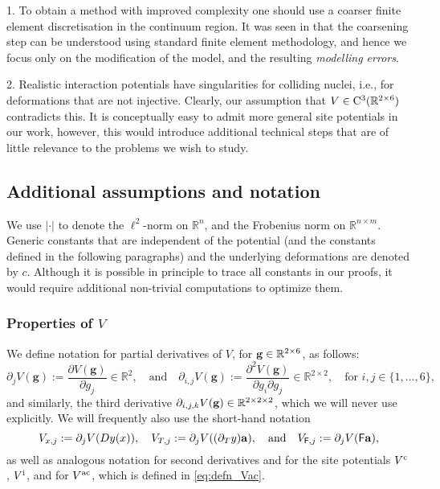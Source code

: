 \documentclass[12pt, reqno, a4paper]{amsart}
\numberwithin{equation}{section}
\numberwithin{theorem}{section}
\numberwithin{remark}{section}
\begin{document}
\begin{remark}
  1. To obtain a method with improved complexity one should use a
  coarser finite element discretisation in the continuum region. It
  was seen in \cite{OrtnerWang:2009a, Ortner:2011:patch} that the
  coarsening step can be understood using standard finite element
  methodology, and hence we focus only on the modification of the
  model, and the resulting {\em modelling errors}.

  2.  Realistic interaction potentials have singularities for
  colliding nuclei, i.e., for deformations that are not
  injective. Clearly, our assumption that $V \in {{\rm C}}^3({\mathbb{R}}^{2 \times
    6})$ contradicts this. It is conceptually easy to admit more
  general site potentials in our work, however, this would introduce
  additional technical steps that are of little relevance to the
  problems we wish to study.
\end{remark}

\subsection{Additional assumptions and notation}
We use $|\cdot|$ to denote the $\ell^2$-norm on ${\mathbb{R}}^n$, and the
Frobenius norm on ${\mathbb{R}}^{n \times m}$. Generic constants that are
independent of the potential (and the constants defined in the
following paragraphs) and the underlying deformations are denoted by
$c$. Although it is possible in principle to trace all constants in
our proofs, it would require additional non-trivial computations to
optimize them.

\subsubsection{Properties of $V$}
\label{sec:prop_V}
We define notation for partial derivatives of $V$, for ${\bf g} \in
{\mathbb{R}}^{2 \times 6}$, as follows:
\begin{displaymath}
  \partial_j V(\mathbf{g}):=\frac{{\partial} V(\mathbf{g})}{{\partial} g_j} \in{\mathbb{R}}^2,
  \quad\text{and}\quad
  \partial_{i,j}V(\mathbf{g}):=\frac{{\partial}^2 V(\mathbf{g})}{{\partial} g_i{\partial}
    g_j} \in{\mathbb{R}}^{2\times 2}, 
  \quad\text{for } i, j \in \{1,\dots,6\},
\end{displaymath}
and similarly, the third derivative ${\partial}_{i,j,k} V({\bf g}) \in
{\mathbb{R}}^{2\times 2 \times 2}$, which we will never use explicitly. We will
frequently also use the short-hand notation
\begin{displaymath}
  V_{x,j} := {\partial}_j V(Dy(x)), \quad V_{T, j} := {\partial}_j V(({\partial_{{T}}} y) {\bf
    a}), \quad \text{and} \quad
  V_{{{\sf F}}, j} := {\partial}_j V({{\sf F}} {\bf a}),
\end{displaymath}
as well as analogous notation for second derivatives and for the site
potentials ${V^{{\rm c}}}$, ${V^{{\rm i}}}$, and for ${V^{{\rm ac}}}$, which is defined in
\eqref{eq:defn_Vac}.
\end{document}
